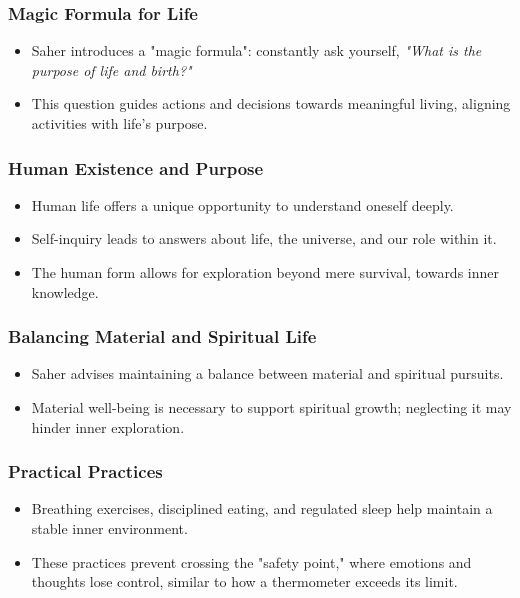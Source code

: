 \begin{frame}[fragile]\frametitle{Magic Formula for Life}
    \begin{itemize}
        \item Saher introduces a "magic formula": constantly ask yourself, \textit{"What is the purpose of life and birth?"}
        \item This question guides actions and decisions towards meaningful living, aligning activities with life's purpose.
    \end{itemize}
\end{frame}

\begin{frame}[fragile]\frametitle{Human Existence and Purpose}
    \begin{itemize}
        \item Human life offers a unique opportunity to understand oneself deeply.
        \item Self-inquiry leads to answers about life, the universe, and our role within it.
        \item The human form allows for exploration beyond mere survival, towards inner knowledge.
    \end{itemize}
\end{frame}

\begin{frame}[fragile]\frametitle{Balancing Material and Spiritual Life}
    \begin{itemize}
        \item Saher advises maintaining a balance between material and spiritual pursuits.
        \item Material well-being is necessary to support spiritual growth; neglecting it may hinder inner exploration.
    \end{itemize}
\end{frame}

\begin{frame}[fragile]\frametitle{Practical Practices}
    \begin{itemize}
        \item Breathing exercises, disciplined eating, and regulated sleep help maintain a stable inner environment.
        \item These practices prevent crossing the "safety point," where emotions and thoughts lose control, similar to how a thermometer exceeds its limit.
    \end{itemize}
\end{frame}

